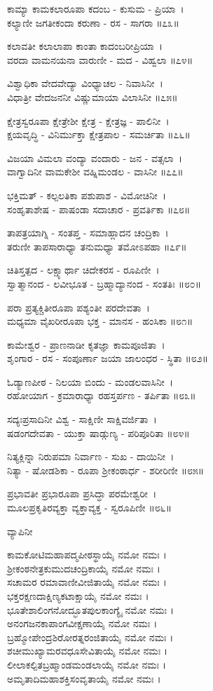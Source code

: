 ಕಾಮ್ಯಾ ಕಾಮಕಲಾರೂಪಾ ಕದಂಬ - ಕುಸುಮ - ಪ್ರಿಯಾ~।\\
ಕಲ್ಯಾಣೀ ಜಗತೀಕಂದಾ ಕರುಣಾ - ರಸ - ಸಾಗರಾ ॥೭೩॥

ಕಲಾವತೀ ಕಲಾಲಾಪಾ ಕಾಂತಾ ಕಾದಂಬರೀಪ್ರಿಯಾ~।\\
ವರದಾ ವಾಮನಯನಾ ವಾರುಣೀ - ಮದ - ವಿಹ್ವಲಾ ॥೭೪॥

ವಿಶ್ವಾಧಿಕಾ ವೇದವೇದ್ಯಾ ವಿಂಧ್ಯಾಚಲ - ನಿವಾಸಿನೀ~।\\
ವಿಧಾತ್ರೀ ವೇದಜನನೀ ವಿಷ್ಣುಮಾಯಾ ವಿಲಾಸಿನೀ ॥೭೫॥

ಕ್ಷೇತ್ರಸ್ವರೂಪಾ ಕ್ಷೇತ್ರೇಶೀ ಕ್ಷೇತ್ರ - ಕ್ಷೇತ್ರಜ್ಞ - ಪಾಲಿನೀ~।\\
ಕ್ಷಯವೃದ್ಧಿ - ವಿನಿರ್ಮುಕ್ತಾ ಕ್ಷೇತ್ರಪಾಲ - ಸಮರ್ಚಿತಾ ॥೭೬॥

ವಿಜಯಾ ವಿಮಲಾ ವಂದ್ಯಾ ವಂದಾರು - ಜನ - ವತ್ಸಲಾ~।\\
ವಾಗ್ವಾದಿನೀ ವಾಮಕೇಶೀ ವಹ್ನಿಮಂಡಲ - ವಾಸಿನೀ ॥೭೭॥

ಭಕ್ತಿಮತ್ - ಕಲ್ಪಲತಿಕಾ ಪಶುಪಾಶ - ವಿಮೋಚಿನೀ~।\\
ಸಂಹೃತಾಶೇಷ - ಪಾಷಂಡಾ ಸದಾಚಾರ - ಪ್ರವರ್ತಿಕಾ ॥೭೮॥

ತಾಪತ್ರಯಾಗ್ನಿ - ಸಂತಪ್ತ - ಸಮಾಹ್ಲಾದನ ಚಂದ್ರಿಕಾ~।\\
ತರುಣೀ ತಾಪಸಾರಾಧ್ಯಾ ತನುಮಧ್ಯಾ ತಮೋಽಪಹಾ ॥೭೯॥

ಚಿತಿಸ್ತತ್ಪದ - ಲಕ್ಷ್ಯಾರ್ಥಾ ಚಿದೇಕರಸ - ರೂಪಿಣೀ~।\\
ಸ್ವಾತ್ಮಾನಂದ - ಲವೀಭೂತ - ಬ್ರಹ್ಮಾದ್ಯಾನಂದ - ಸಂತತಿಃ ॥೮೦॥

ಪರಾ ಪ್ರತ್ಯಕ್ಚಿತೀರೂಪಾ ಪಶ್ಯಂತೀ ಪರದೇವತಾ~।\\
ಮಧ್ಯಮಾ ವೈಖರೀರೂಪಾ ಭಕ್ತ - ಮಾನಸ - ಹಂಸಿಕಾ ॥೮೧॥

ಕಾಮೇಶ್ವರ - ಪ್ರಾಣನಾಡೀ ಕೃತಜ್ಞಾ ಕಾಮಪೂಜಿತಾ~।\\
ಶೃಂಗಾರ - ರಸ - ಸಂಪೂರ್ಣಾ ಜಯಾ ಜಾಲಂಧರ - ಸ್ಥಿತಾ ॥೮೨॥

ಓಡ್ಯಾಣಪೀಠ - ನಿಲಯಾ ಬಿಂದು - ಮಂಡಲವಾಸಿನೀ~।\\
ರಹೋಯಾಗ - ಕ್ರಮಾರಾಧ್ಯಾ ರಹಸ್ತರ್ಪಣ - ತರ್ಪಿತಾ ॥೮೩॥

ಸದ್ಯಃಪ್ರಸಾದಿನೀ ವಿಶ್ವ - ಸಾಕ್ಷಿಣೀ ಸಾಕ್ಷಿವರ್ಜಿತಾ~।\\
ಷಡಂಗದೇವತಾ - ಯುಕ್ತಾ ಷಾಡ್ಗುಣ್ಯ - ಪರಿಪೂರಿತಾ ॥೮೪॥

ನಿತ್ಯಕ್ಲಿನ್ನಾ ನಿರುಪಮಾ ನಿರ್ವಾಣ - ಸುಖ - ದಾಯಿನೀ~।\\
ನಿತ್ಯಾ - ಷೋಡಶಿಕಾ - ರೂಪಾ ಶ್ರೀಕಂಠಾರ್ಧ - ಶರೀರಿಣೀ ॥೮೫॥

ಪ್ರಭಾವತೀ ಪ್ರಭಾರೂಪಾ ಪ್ರಸಿದ್ಧಾ ಪರಮೇಶ್ವರೀ~।\\
ಮೂಲಪ್ರಕೃತಿರವ್ಯಕ್ತಾ ವ್ಯಕ್ತಾವ್ಯಕ್ತ - ಸ್ವರೂಪಿಣೀ ॥೮೬॥

ವ್ಯಾಪಿನೀ 

ಕಾಮಕೋಟಿಮಹಾಪದ್ಮಪೀಠಸ್ಥಾಯೈ ನಮೋ ನಮಃ ।\\
ಶ್ರೀಕಂಠನೇತ್ರಕುಮುದಚಂದ್ರಿಕಾಯೈ ನಮೋ ನಮಃ ।\\
ಸಚಾಮರ ರಮಾವಾಣೀವೀಜಿತಾಯೈ ನಮೋ ನಮಃ ।\\
ಭಕ್ತರಕ್ಷಣದಾಕ್ಷಿಣ್ಯಕಟಾಕ್ಷಾಯೈ ನಮೋ ನಮಃ ।\\
ಭೂತೇಶಾಲಿಂಗನೋದ್ಭೂತಪುಲಕಾಂಗ್ಯೈ ನಮೋ ನಮಃ ।\\
ಅನಂಗಜನಕಾಪಾಂಗವೀಕ್ಷಣಾಯೈ ನಮೋ ನಮಃ ।\\
ಬ್ರಹ್ಮೋಪೇಂದ್ರಶಿರೋರತ್ನರಂಜಿತಾಯೈ ನಮೋ ನಮಃ ।\\
ಶಚೀಮುಖ್ಯಾಮರವಧೂಸೇವಿತಾಯೈ ನಮೋ ನಮಃ ।\\
ಲೀಲಾಕಲ್ಪಿತಬ್ರಹ್ಮಾಂಡಮಂಡಲಾಯೈ ನಮೋ ನಮಃ ।\\
ಅಮೃತಾದಿಮಹಾಶಕ್ತಿಸಂವೃತಾಯೈ ನಮೋ ನಮಃ ।

